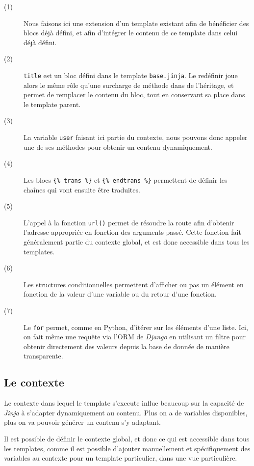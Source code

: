 \documentclass[a4paper]{report}
\begin{document}
\begin{description}
    \item[(1)] Nous faisons ici une extension d'un template existant afin de bénéficier des blocs déjà défini, et afin
        d'intégrer le contenu de ce template dans celui déjà défini.
    \item[(2)] \verb#title# est un bloc défini dans le template \verb#base.jinja#. Le redéfinir joue alors le même rôle
        qu'une surcharge de méthode dans de l'héritage, et permet de remplacer le contenu du bloc, tout en conservant sa
        place dans le template parent.
    \item[(3)] La variable \verb#user# faisant ici partie du contexte, nous pouvons donc appeler une de ses méthodes
        pour obtenir un contenu dynamiquement.
    \item[(4)] Les blocs \verb#{% trans %}# et \verb#{% endtrans %}# permettent de définir les chaînes qui vont ensuite
            être traduites.
    \item[(5)] L'appel à la fonction \verb#url()# permet de résoudre la route afin d'obtenir l'adresse appropriée en
        fonction des arguments passé. Cette fonction fait généralement partie du contexte global, et est donc accessible
        dans tous les templates.
    \item[(6)] Les structures conditionnelles permettent d'afficher ou pas un élément en fonction de la valeur d'une
        variable ou du retour d'une fonction.
    \item[(7)] Le \verb#for# permet, comme en Python, d'itérer sur les éléments d'une liste. Ici, on fait même une
        requête via l'ORM de \emph{Django} en utilisant un filtre pour obtenir directement des valeurs depuis la base de
        donnée de manière transparente.
\end{description}

\subsection{Le contexte}
\label{sub:le_contexte}
\par Le contexte dans lequel le template s'execute influe beaucoup sur la capacité de \emph{Jinja} à s'adapter
dynamiquement au contenu. Plus on a de variables disponibles, plus on va pouvoir générer un contenu s'y adaptant.
\par Il est possible de définir le contexte global, et donc ce qui est accessible dans tous les templates, comme il est
possible d'ajouter manuellement et spécifiquement des variables au contexte pour un template particulier, dans une vue
particulière.
\end{document}
